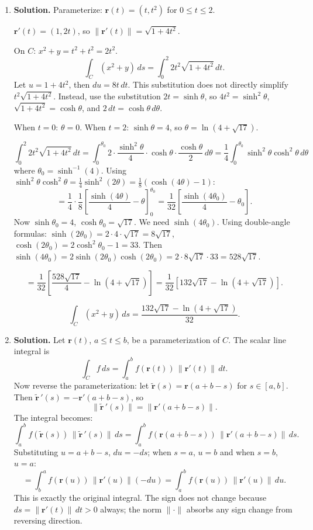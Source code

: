 \begin{enumerate}
Then $\mathbf{r}'(t) = (2,4)$ and $\|\mathbf{r}'(t)\| = \sqrt{4+16} = \sqrt{20} = 2\sqrt{5}$.

On $C$: $x+y = 2t + 4t = 6t$.
\[
\int_C (x+y)\,ds = \int_0^1 6t \cdot 2\sqrt{5}\,dt = 12\sqrt{5}\int_0^1 t\,dt = 12\sqrt{5}\cdot\frac{1}{2} = \boxed{6\sqrt{5}}.
\]

\item \textbf{Solution.}
Parameterize: $\mathbf{r}(t) = (t, t^2)$ for $0 \le t \le 2$.

$\mathbf{r}'(t) = (1, 2t)$, so $\|\mathbf{r}'(t)\| = \sqrt{1+4t^2}$.

On $C$: $x^2+y = t^2 + t^2 = 2t^2$.
\[
\int_C (x^2+y)\,ds = \int_0^2 2t^2\sqrt{1+4t^2}\,dt.
\]
Let $u = 1+4t^2$, then $du = 8t\,dt$. This substitution does not directly simplify $t^2\sqrt{1+4t^2}$. Instead, use the substitution $2t = \sinh\theta$, so $4t^2 = \sinh^2\theta$, $\sqrt{1+4t^2}=\cosh\theta$, and $2\,dt = \cosh\theta\,d\theta$.

When $t=0$: $\theta=0$. When $t=2$: $\sinh\theta=4$, so $\theta = \ln(4+\sqrt{17})$.

\[
\int_0^2 2t^2\sqrt{1+4t^2}\,dt = \int_0^{\theta_0} 2\cdot\frac{\sinh^2\theta}{4}\cdot\cosh\theta\cdot\frac{\cosh\theta}{2}\,d\theta = \frac{1}{4}\int_0^{\theta_0}\sinh^2\theta\cosh^2\theta\,d\theta
\]
where $\theta_0 = \sinh^{-1}(4)$. Using $\sinh^2\theta\cosh^2\theta = \frac{1}{4}\sinh^2(2\theta)= \frac{1}{8}(\cosh(4\theta)-1)$:
\[
= \frac{1}{4}\cdot\frac{1}{8}\left[\frac{\sinh(4\theta)}{4}-\theta\right]_0^{\theta_0} = \frac{1}{32}\left[\frac{\sinh(4\theta_0)}{4}-\theta_0\right].
\]
Now $\sinh\theta_0 = 4$, $\cosh\theta_0 = \sqrt{17}$. We need $\sinh(4\theta_0)$. Using double-angle formulas: $\sinh(2\theta_0)=2\cdot4\cdot\sqrt{17}=8\sqrt{17}$, $\cosh(2\theta_0)=2\cosh^2\theta_0-1=33$. Then $\sinh(4\theta_0) = 2\sinh(2\theta_0)\cosh(2\theta_0) = 2\cdot8\sqrt{17}\cdot33 = 528\sqrt{17}$.

\[
= \frac{1}{32}\left[\frac{528\sqrt{17}}{4} - \ln(4+\sqrt{17})\right] = \frac{1}{32}\left[132\sqrt{17} - \ln(4+\sqrt{17})\right].
\]

\[
\boxed{\int_C (x^2+y)\,ds = \frac{132\sqrt{17} - \ln(4+\sqrt{17})}{32}.}
\]

\item \textbf{Solution.}
Let $\mathbf{r}(t)$, $a\le t\le b$, be a parameterization of $C$. The scalar line integral is
\[
\int_C f\,ds = \int_a^b f(\mathbf{r}(t))\,\|\mathbf{r}'(t)\|\,dt.
\]
Now reverse the parameterization: let $\tilde{\mathbf{r}}(s) = \mathbf{r}(a+b-s)$ for $s\in[a,b]$. Then $\tilde{\mathbf{r}}\,'(s) = -\mathbf{r}'(a+b-s)$, so
\[
\|\tilde{\mathbf{r}}\,'(s)\| = \|\mathbf{r}'(a+b-s)\|.
\]
The integral becomes:
\[
\int_a^b f(\tilde{\mathbf{r}}(s))\,\|\tilde{\mathbf{r}}\,'(s)\|\,ds = \int_a^b f(\mathbf{r}(a+b-s))\,\|\mathbf{r}'(a+b-s)\|\,ds.
\]
Substituting $u = a+b-s$, $du = -ds$; when $s=a$, $u=b$ and when $s=b$, $u=a$:
\[
= \int_b^a f(\mathbf{r}(u))\,\|\mathbf{r}'(u)\|(-du) = \int_a^b f(\mathbf{r}(u))\,\|\mathbf{r}'(u)\|\,du.
\]
This is exactly the original integral. The sign does not change because $ds = \|\mathbf{r}'(t)\|\,dt > 0$ always; the norm $\|\cdot\|$ absorbs any sign change from reversing direction.


\end{enumerate}
